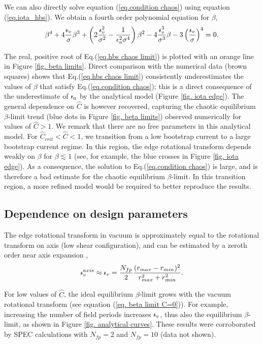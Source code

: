 \documentclass[my_thesis.tex]{subfiles}
\begin{document}
We can also directly solve equation (\ref{eq.condition chaos}) using equation (\ref{eq.iota_hbs}). We obtain a fourth order polynomial equation for $\beta$,
\begin{equation}
	\beta^4 + 4\frac{\iotabar_v}{\sigma}\beta^3 + \left(2\frac{\iotabar_v^2}{\sigma^2}-\frac{1}{\epsilon_a^2\sigma^4}\right)\beta^2 - 4\frac{\iotabar_v^3}{\sigma^3}\beta - 3\left(\frac{\iotabar_v}{\sigma}\right)^4 = 0. \label{eq.hbs chaos limit}
\end{equation}

The real, positive root of Eq.(\ref{eq.hbs chaos limit}) is plotted with an orange line in Figure \ref{fig. beta limits}. Direct comparison with the numerical data (brown squares) shows that Eq.(\ref{eq.hbs chaos limit}) consistently underestimates the values of $\beta$ that satisfy Eq.(\ref{eq.condition chaos}); this is a direct consequence of the underestimate of $\text{$\iota\!\!$-}_a$ by the analytical model (Figure \ref{fig. iota edge}). The general dependence on $\hat{C}$ is however recovered, capturing the chaotic equilibrium $\beta$-limit trend (blue dots in Figure \ref{fig. beta limits}) observed numerically for values of $\hat{C}>1$. We remark that there are no free parameters in this analytical model. For $\hat{C}_{crit}<\hat{C}<1$, we transition from a low bootstrap current to a large bootstrap current regime. In this region, the edge rotational transform depends weakly on $\beta$ for $\beta\lesssim 1$ (see, for example, the blue crosses in Figure \ref{fig. iota edge}). As a consequence, the solution to Eq.(\ref{eq.condition chaos}) is large, and is therefore a bad estimate for the chaotic equilibrium $\beta$-limit. In this transition region, a more refined model would be required to better reproduce the results.


\subsection{Dependence on design parameters}
The edge rotational transform in vacuum is approximately equal to the rotational transform on axis (low shear configuration), and can be estimated by a zeroth order near axis expansion \citep{helanderTheoryPlasmaConfinement2014,Loizu2017},
\begin{equation}
	\text{$\iota\!\!$-}^{axis}_v\approx\text{$\iota\!\!$-}_v = \frac{N_{fp}}{2}\frac{(r_{max}-r_{min})^2}{r_{max}^2+r_{min}^2}.
\end{equation}


For low values of $\hat{C}$, the ideal equilibrium $\beta$-limit grows with the vacuum rotational transform (see equation (\ref{eq. beta limit C=0})). For example, increasing the number of field periods increases $\text{$\iota\!\!$-}_v$, thus also the equilibrium $\beta$-limit, as shown in Figure \ref{fig. analytical curves}. These results were corroborated by SPEC calculations with $N_{fp}=2$ and $N_{fp}=10$ (data not shown). 
\end{document}
